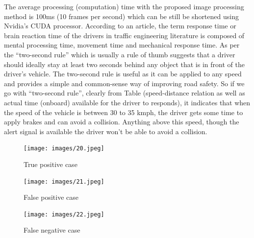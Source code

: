 \documentclass[14pt,a4paper,final]{extreport}
\begin{document}
The average processing (computation) time with the proposed image processing method is 100ms (10 frames per second) which can be still be shortened using Nvidia’s CUDA processor. According to an article, the term response time or brain reaction time of the drivers in traffic engineering literature is composed of mental processing time, movement time and mechanical response time. As per the “two-second rule” which is usually a rule of thumb suggests that a driver should ideally stay at least two seconds behind any object that is in front of the driver’s vehicle. The two-second rule is useful as it can be applied to any speed and provides a simple and common-sense way of improving road safety. So if we go with “two-second rule”, clearly from Table (speed-distance relation as well as actual time (onboard) available for the driver to responds), it indicates that when the speed of the vehicle is between 30 to 35 kmph, the driver gets some time to apply brakes and can avoid a collision. Anything above this speed, though the alert signal is available the driver won’t be able to avoid a collision.
\newline
\newline

\begin{figure}[h]
	\begin{center}
		\texttt{[image: images/20.jpeg]}
		\vspace{.1 cm}
		\caption[True positive case]{True positive case}
	\end{center}
\end{figure}

\begin{figure}[h]
	\begin{center}
		\texttt{[image: images/21.jpeg]}
		\vspace{.1 cm}
		\caption[False positive case]{False positive case}
	\end{center}
\end{figure}

\begin{figure}[h]
	\begin{center}
		\texttt{[image: images/22.jpeg]}
		\vspace{.1 cm}
		\caption[False negative case]{False negative case}
	\end{center}
\end{figure}
\end{document}
